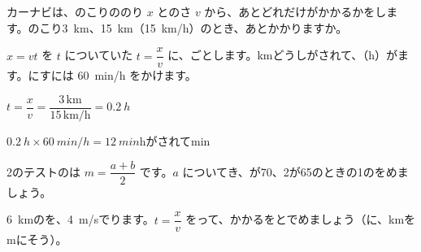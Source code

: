 \begin{reidai}
カーナビは、のこりののり $x$ とのさ $v$ から、あとどれだけがかかるかをします。のこり\qty{3}{km}、\qty{15}{km}（\qty{15}{km/h}）のとき、あとかかりますか。\par
\kangaekata $x=vt$ を $t$ についていた $t=\dfrac{x}{v}$ に、ごとします。kmどうしがされて、（h）がます。にすには \qty{60}{min/h} をかけます。\par
\shiki $t=\dfrac{x}{v}=\dfrac{3\,\mathrm{km}}{15\,\mathrm{km/h}}=\qty{0.2}{h}$\par
\hspace*{2.6\zw}$\qty{0.2}{h}\times\qty{60}{min/h}=\qty{12}{min}$\quad hがされてmin\par
{}
\end{reidai}

\begingroup{}%
\noindent\begin{minipage}[t]{0.49\linewidth}
\begin{jibun}
2のテストのは $m=\dfrac{a+b}{2}$ です。$a$ についてき、が70、2が65のときの1のをめましょう。
\end{jibun}
\end{minipage}\hfill
\begin{minipage}[t]{0.49\linewidth}
\begin{jibun}
\qty{6}{km}のを、\qty{4}{m/s}でります。$t=\dfrac{x}{v}$ をって、かかるをとでめましょう（に、kmをmにそう）。
\end{jibun}
\end{minipage}\par
\endgroup


